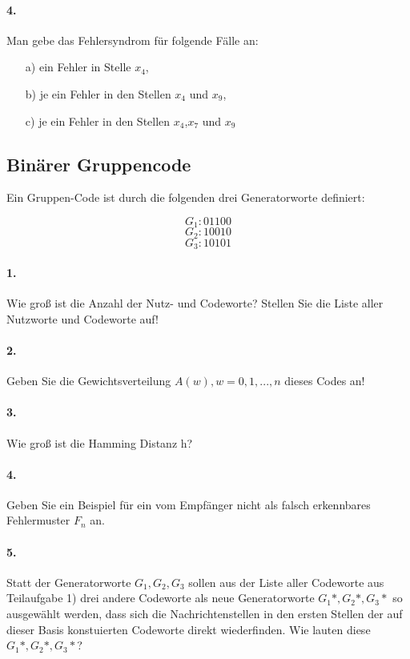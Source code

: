 \documentclass[paper=a4, fontsize=11pt]{scrartcl}
\numberwithin{equation}{section}
\numberwithin{figure}{section}
\numberwithin{table}{section}
\begin{document}
\paragraph{4.}
Man gebe das Fehlersyndrom für folgende Fälle an:
\begin{itemize}
\item[a)] ein Fehler in Stelle $x_{4}$,
\item[b)] je ein Fehler in den Stellen $x_{4}$ und $x_{9}$,
\item[c)] je ein Fehler in den Stellen $x_{4}$,$x_{7}$ und $x_{9}$
\end{itemize}

\subsection{Binärer Gruppencode}
Ein Gruppen-Code ist durch die folgenden drei Generatorworte definiert:

$$G_{1}: 01100$$
$$G_{2}: 10010$$
$$G_{3}: 10101$$

\paragraph{1.}
Wie groß ist die Anzahl der Nutz- und Codeworte? Stellen Sie die Liste aller Nutzworte und Codeworte auf!

\paragraph{2.}
Geben Sie die Gewichtsverteilung $A(w), w=0,1, ...,n$ dieses Codes an!

\paragraph{3.}
Wie groß ist die Hamming Distanz h?

\paragraph{4.}
Geben Sie ein Beispiel für ein vom Empfänger nicht als falsch erkennbares Fehlermuster $F_{n}$ an.

\paragraph{5.}
Statt der Generatorworte $G_{1}, G_{2}, G_{3}$ sollen aus der Liste aller Codeworte aus Teilaufgabe 1) drei andere Codeworte als neue Generatorworte $G_{1}*, G_{2}*, G_{3}*$ so ausgewählt werden, dass sich die Nachrichtenstellen in den ersten Stellen der auf dieser Basis konstuierten Codeworte direkt wiederfinden. Wie lauten diese $G_{1}*, G_{2}*, G_{3}*$?
\end{document}
